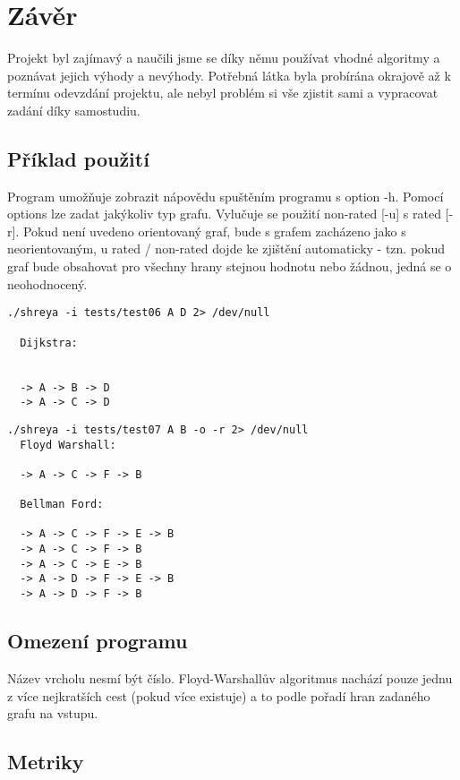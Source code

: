 \documentclass[a4paper,11pt]{article}
\begin{document}
\section{Závěr}
Projekt byl zajímavý a naučili jsme se díky němu používat vhodné algoritmy a poznávat jejich výhody a nevýhody. Potřebná látka byla probírána okrajově až k termínu odevzdání projektu, ale nebyl problém si vše zjistit sami a vypracovat zadání díky samostudiu.

\newpage

\subsection{Příklad použití}

Program umožňuje zobrazit nápovědu spuštěním programu s option -h. Pomocí options lze zadat jakýkoliv typ grafu. Vylučuje se použití non-rated [-u] s rated [-r]. Pokud není uvedeno orientovaný graf, bude s grafem zacházeno jako s neorientovaným, u rated / non-rated dojde ke zjištění automaticky - tzn. pokud graf bude obsahovat pro všechny hrany stejnou hodnotu nebo žádnou, jedná se o neohodnocený.

\lstset{language=Bash}
\begin{lstlisting}[frame=single,breaklines]
  ./shreya -i tests/test06 A D 2> /dev/null

  Dijkstra:


  -> A -> B -> D
  -> A -> C -> D

\end{lstlisting}

\lstset{language=Bash}
\begin{lstlisting}[frame=single,breaklines]
  ./shreya -i tests/test07 A B -o -r 2> /dev/null
  Floyd Warshall:

  -> A -> C -> F -> B

  Bellman Ford:

  -> A -> C -> F -> E -> B
  -> A -> C -> F -> B
  -> A -> C -> E -> B
  -> A -> D -> F -> E -> B
  -> A -> D -> F -> B
\end{lstlisting}

\subsection{Omezení programu}
Název vrcholu nesmí být číslo. Floyd-Warshallův algoritmus nachází pouze jednu z více nejkratších cest (pokud více existuje) a to podle pořadí hran zadaného grafu na vstupu.

\subsection{Metriky}
\end{document}
